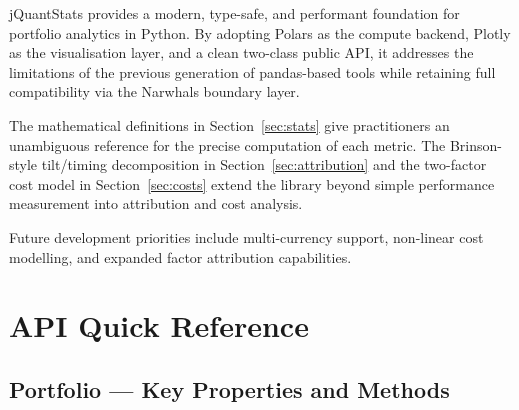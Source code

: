 \documentclass[11pt,a4paper]{article}
\begin{document}
jQuantStats provides a modern, type-safe, and performant foundation for
portfolio analytics in Python.  By adopting Polars as the compute backend,
Plotly as the visualisation layer, and a clean two-class public API, it
addresses the limitations of the previous generation of pandas-based tools
while retaining full compatibility via the Narwhals boundary layer.

The mathematical definitions in Section~\ref{sec:stats} give practitioners
an unambiguous reference for the precise computation of each metric.  The
Brinson-style tilt/timing decomposition in Section~\ref{sec:attribution} and
the two-factor cost model in Section~\ref{sec:costs} extend the library beyond
simple performance measurement into attribution and cost analysis.

Future development priorities include multi-currency support, non-linear cost
modelling, and expanded factor attribution capabilities.




\appendix

\section{API Quick Reference}
\label{app:api}

\subsection{Portfolio — Key Properties and Methods}
\end{document}
